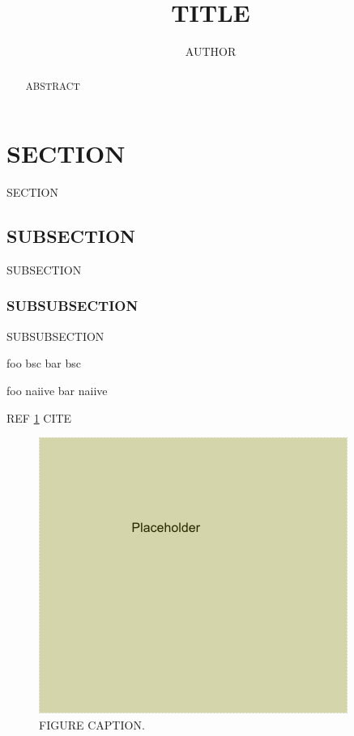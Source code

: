 \documentclass[11pt,twoside]{article}
\author{AUTHOR}
\title{TITLE}
\date{}
\newcommand*{\ShowAbstract}{} %
\begin{document}
\sffamily %


\maketitle

\ifdefined\ShowAbstract \begin{abstract}
ABSTRACT
\end{abstract} \fi

\setcounter{tocdepth}{2}
\tableofcontents


\clearpage \section{SECTION} %
\label{sec:SECTION}

SECTION

\subsection{SUBSECTION}
SUBSECTION

\subsubsection{SUBSUBSECTION}
SUBSUBSECTION

foo \gls{bsc}
bar \gls{bsc}

foo \gls{naiive}
bar \gls{naiive}

REF \ref{sec:SECTION}
CITE \cite{Shannon1948}

\begin{figure}[!ht]
    \centering
    \includegraphics[width=.5\linewidth]{img/placeholder.png}
    \caption{FIGURE CAPTION.
    \label{fig:placeholder}}
\end{figure}
\end{document}
